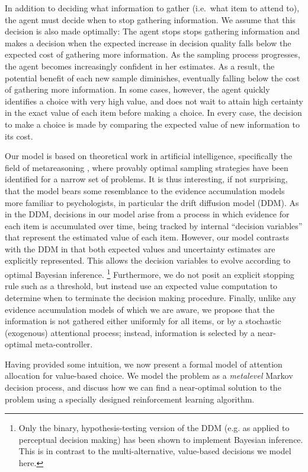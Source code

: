 \documentclass[12pt,a4paperpaper,]{article}
\begin{document}
In addition to deciding what information to gather (i.e.~what item to attend to), the agent must decide when to stop gathering information. We assume that this decision is also made optimally: The agent stops stops gathering information and makes a decision when the expected increase in decision quality falls below the expected cost of gathering more information. As the sampling process progresses, the agent becomes increasingly confident in her estimates. As a result, the potential benefit of each new sample diminishes, eventually falling below the cost of gathering more information. In some cases, however, the agent quickly identifies a choice with very high value, and does not wait to attain high certainty in the exact value of each item before making a choice. In every case, the decision to make a choice is made by comparing the expected value of new information to its cost.

Our model is based on theoretical work in artificial intelligence, specifically the field of metareasoning \citep{Hay2012}, where provably optimal sampling strategies have been identified for a narrow set of problems. It is thus interesting, if not surprising, that the model bears some resemblance to the evidence accumulation models more familiar to psychologists, in particular the drift diffusion model (DDM). As in the DDM, decisions in our model arise from a process in which evidence for each item is accumulated over time, being tracked by internal ``decision variables'' that represent the estimated value of each item. However, our model contrasts with the DDM in that both expected values and uncertainty estimates are explicitly represented. This allows the decision variables to evolve according to optimal Bayesian inference.%
  \footnote{Only the binary, hypothesis-testing version of the DDM (e.g. as applied to perceptual decision making) has been shown to implement Bayesian inference. This is in contrast to the multi-alternative, value-based decisions we model here.}
Furthermore, we do not posit an explicit stopping rule such as a threshold, but instead use an expected value computation to determine when to terminate the decision making procedure. Finally, unlike any evidence accumulation models of which we are aware, we propose that the information is not gathered either uniformly for all items, or by a stochastic (exogenous) attentional process; instead, information is selected by a near-optimal meta-controller.

Having provided some intuition, we now present a formal model of attention allocation for value-based choice. We model the problem as a \emph{metalevel} Markov decision process, and discuss how we can find a near-optimal solution to the problem using a specially designed reinforcement learning algorithm.
\end{document}
